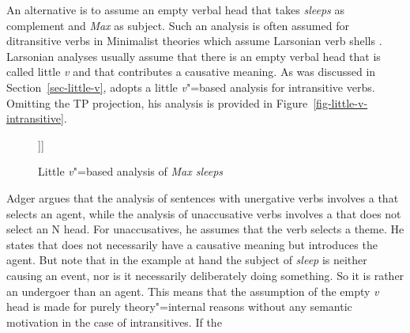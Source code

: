 An alternative is to assume an empty verbal head that takes \emph{sleeps} as complement and
\emph{Max} as subject. Such an analysis is often assumed for ditransitive verbs in Minimalist
theories which assume Larsonian verb shells \citep{Larson88a}. Larsonian analyses usually assume
that there is an empty verbal head that is called little \emph{v} and that contributes a causative
meaning. As was discussed in Section~\ref{sec-little-v}, \citet{Adger2003a} adopts a little \emph{v}"=based analysis for intransitive verbs. Omitting the
TP projection, his analysis is provided in Figure~\vref{fig-little-v-intransitive}.
\begin{figure}
\begin{forest}
[\emph{v}P
  [Max]
  [{$\overline{v}$}
    [\textit{v}]
    [\emph{sleep}]]]
\end{forest}
\caption{\label{fig-little-v-intransitive}Little \emph{v}"=based analysis of \emph{Max sleeps}}
\end{figure}%
Adger argues that the analysis of sentences with unergative verbs involves a \littlev that
selects an agent, while the analysis of unaccusative verbs involves a \littlev that does not
select an N head. For unaccusatives, he assumes that the verb selects a theme. 
He states that \littlev does not necessarily have a causative meaning but introduces the agent. But note that in
the example at hand the subject of \emph{sleep} is neither causing an event, nor is it necessarily
deliberately doing something. So it is rather an undergoer than an agent. This means that the assumption of the empty \emph{v} head is made for
purely theory"=internal reasons without any semantic motivation in the case of intransitives. If the
